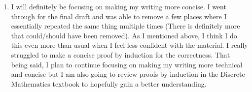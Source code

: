 \documentclass[11pt]{article}
\theoremstyle{nonumberplain}
\begin{document}
\begin{enumerate}
\item I will definitely be focusing on making my writing more concise. I went through for the final draft and was able to remove a few places where I essentially repeated the same thing multiple times (There is definitely more that could/should have been removed). As I mentioned above, I think I do this even more than usual when I feel less confident with the material. I really struggled to make a concise proof by induction for the correctness. That being said, I plan to continue focusing on making my writing more technical and concise but I am also going to review proofs by induction in the Discrete Mathematics textbook to hopefully gain a better understanding.  
\end{enumerate}
  
\end{document}
